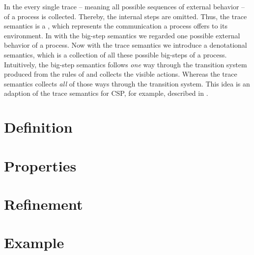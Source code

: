 In the  every single trace -- meaning all possible sequences of external behavior -- of a process is collected. Thereby, the internal steps are omitted. Thus, the trace semantics is a , which represents the communication a process offers to its environment. In  with the big-step semantics we regarded one possible external behavior of a process. Now with the trace semantics we introduce a denotational semantics, which is a collection of all these possible big-steps of a process. Intuitively, the big-step semantics follows \textit{one} way through the transition system produced from the rules of  and collects the visible actions. Whereas the trace semantics collects \textit{all} of those ways through the transition system. This idea is an adaption of the trace semantics for CSP, for example, described in \cite{roscoe}.


\section{Definition}
\label{sec_de_sem_trace_def}


\section{Properties}
\label{sec_de_sem_trace_prop}


\section{Refinement}
\label{sec_de_sem_trace_ref}


\section{Example}
\label{sec_de_sem_trace_example}

